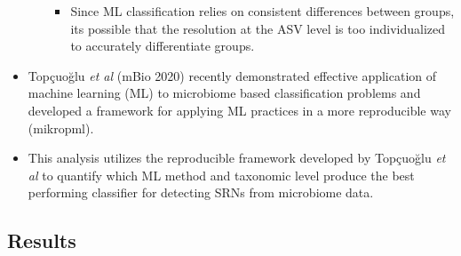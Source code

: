 \documentclass[
]{article}
\providecommand{\tightlist}{%
  \setlength{\itemsep}{0pt}\setlength{\parskip}{0pt}}
\begin{document}
\begin{itemize}
\begin{itemize}
    \begin{itemize}
    \tightlist
    \item
      Since ML classification relies on consistent differences between
      groups, its possible that the resolution at the ASV level is too
      individualized to accurately differentiate groups.
    \end{itemize}
  \end{itemize}
\item
  Topçuoğlu \emph{et al} (mBio 2020) recently demonstrated effective
  application of machine learning (ML) to microbiome based
  classification problems and developed a framework for applying ML
  practices in a more reproducible way (mikropml).
\item
  This analysis utilizes the reproducible framework developed by
  Topçuoğlu \emph{et al} to quantify which ML method and taxonomic level
  produce the best performing classifier for detecting SRNs from
  microbiome data.
\end{itemize}

\hypertarget{results}{%
\subsection{Results}\label{results}}
\end{document}
